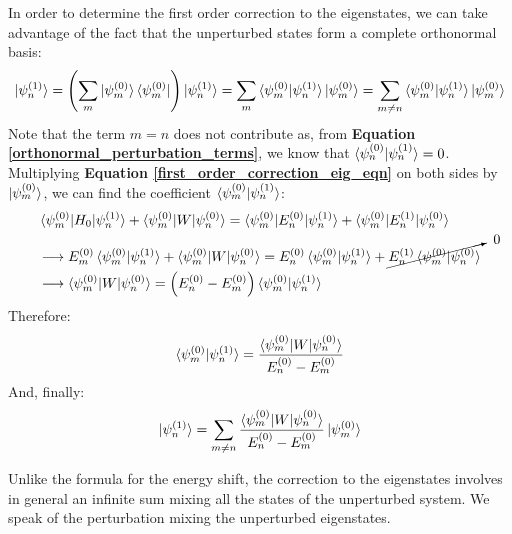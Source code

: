 In order to determine the first order correction to the eigenstates, we can take advantage of the fact that the unperturbed states form a complete orthonormal basis:
\begin{equation}
    \ket{\psi_n^{(1)}} = \left(\sum_m \ket{\psi_m^{(0)}}\bra{\psi_m^{(0)}}\right)\ket{\psi_n^{(1)}} = \sum_m \braket{\psi_m^{(0)}|\psi_n^{(1)}}\ket{\psi_m^{(0)}} = \sum_{m\neq n} \braket{\psi_m^{(0)}|\psi_n^{(1)}}\ket{\psi_m^{(0)}}
\end{equation}
Note that the term $m = n$ does not contribute as, from \textbf{Equation \ref{orthonormal_perturbation_terms}}, we know that $\braket{\psi_n^{(0)}|\psi_n^{(1)}} = 0$. Multiplying \textbf{Equation \ref{first_order_correction_eig_eqn}} on both sides by $\ket{\psi_m^{(0)}}$, we can find the coefficient $\braket{\psi_m^{(0)}|\psi_n^{(1)}}$:
\begin{equation}
    \begin{split}
        &\braket{\psi_m^{(0)}|H_0|\psi_n^{(1)}} + \braket{\psi_m^{(0)}|W|\psi_n^{(0)}} = \braket{\psi_m^{(0)}|E_n^{(0)}|\psi_n^{(1)}} + \braket{\psi_m^{(0)}|E_n^{(1)}|\psi_n^{(0)}}\\
        &\longrightarrow E_m^{(0)}\braket{\psi_m^{(0)}|\psi_n^{(1)}} + \braket{\psi_m^{(0)}|W|\psi_n^{(0)}} = E_n^{(0)}\braket{\psi_m^{(0)}|\psi_n^{(1)}} + \cancelto{\ 0}{E_n^{(1)}\braket{\psi_m^{(0)}|\psi_n^{(0)}}} \\
        &\longrightarrow \braket{\psi_m^{(0)}|W|\psi_n^{(0)}} = \left(E_n^{(0)} - E_m^{(0)}\right)\braket{\psi_m^{(0)}|\psi_n^{(1)}}
    \end{split}
\end{equation}
Therefore:
\begin{equation}
    \braket{\psi_m^{(0)}|\psi_n^{(1)}} = \frac{\braket{\psi_m^{(0)}|W|\psi_n^{(0)}}}{E_n^{(0)} - E_m^{(0)}}
\end{equation}
And, finally:
\begin{equation}
    \ket{\psi_n^{(1)}} = \sum_{m\neq n} \frac{\braket{\psi_m^{(0)}|W|\psi_n^{(0)}}}{E_n^{(0)} - E_m^{(0)}}\ket{\psi_m^{(0)}}
\end{equation}

Unlike the formula for the energy shift, the correction to the eigenstates involves in general an infinite sum mixing all the states of the unperturbed system. We speak of the perturbation mixing the unperturbed eigenstates.


